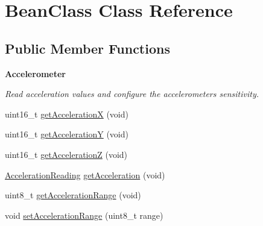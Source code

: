 \hypertarget{class_bean_class}{}\section{Bean\+Class Class Reference}
\label{class_bean_class}
\subsection*{Public Member Functions}
\begin{Indent}{\bf Accelerometer}\par
{\em Read acceleration values and configure the accelerometer\textquotesingle{}s sensitivity. }\begin{DoxyCompactItemize}
\item 
uint16\+\_\+t \hyperlink{class_bean_class_a00e0acb00c41d234b533a7b41ad047cd}{get\+AccelerationX} (void)
\item 
uint16\+\_\+t \hyperlink{class_bean_class_a6f10d22cc2d3ed4fcc6a63c19858168f}{get\+AccelerationY} (void)
\item 
uint16\+\_\+t \hyperlink{class_bean_class_a681df15a2b6952547d536f8faebce802}{get\+AccelerationZ} (void)
\item 
\hyperlink{struct_a_c_c___r_e_a_d_i_n_g___t}{Acceleration\+Reading} \hyperlink{class_bean_class_a53f2174dd2f3c2907acc3355cef64842}{get\+Acceleration} (void)
\item 
uint8\+\_\+t \hyperlink{class_bean_class_ad08dec6f240de8a53f110ddf066f6ab2}{get\+Acceleration\+Range} (void)
\item 
void \hyperlink{class_bean_class_acb8e9a741e2538393256f95d27c4571d}{set\+Acceleration\+Range} (uint8\+\_\+t range)
\end{DoxyCompactItemize}
\end{Indent}
